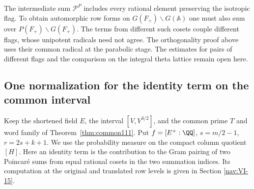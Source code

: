 \documentclass[a4paper,11pt]{article}
\theoremstyle{definition}
\theoremstyle{remark}
\numberwithin{equation}{section}
\begin{document}
The intermediate sum \(\mathcal P^P\) includes every rational
element preserving the isotropic flag. To obtain automorphic row
forms on \(G(F_+)\backslash G(\mathbb A)\) one must also sum over
\(P(F_+)\backslash G(F_+)\). The terms from different such cosets
couple different flags, whose unipotent radicals need not agree.
The orthogonality proof above uses their common radical at the
parabolic stage. The estimates for pairs of different flags and
the comparison on the integral theta lattice remain open here.

\subsection{One normalization for the identity term on the common interval}\label{nav:VI-27}
Keep the shortened field \(E\), the interval \([V,V^{3/2}]\), and
the common prime \(T\) and word family of Theorem~\ref{thm:common111}.
Put \(f=[E^+:\QQ]\), \(s=m/2-1\), \(r=2s+k+1\). We use the
probability measure on the compact column quotient \([H]\).
Here an identity term is the contribution to the Gram pairing
of two Poincar\'e sums from equal rational cosets in the two
summation indices. Its computation at the original and translated
row levels is given in
Section \ref{nav:VI-15}.
\end{document}
